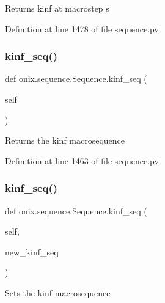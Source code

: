 \begin{DoxyVerb}Returns kinf at macrostep s\end{DoxyVerb}
 

Definition at line 1478 of file sequence.\+py.

\mbox{\label{classonix_1_1sequence_1_1Sequence_a26c2778e995e1732009b0748bc36104f}} 
\subsubsection{\texorpdfstring{kinf\+\_\+seq()}{kinf\_seq()}\hspace{0.1cm}{\footnotesize\ttfamily [1/2]}}
{\footnotesize\ttfamily def onix.\+sequence.\+Sequence.\+kinf\+\_\+seq (\begin{DoxyParamCaption}\item[{}]{self }\end{DoxyParamCaption})}

\begin{DoxyVerb}Returns the kinf macrosequence
\end{DoxyVerb}
 

Definition at line 1463 of file sequence.\+py.

\mbox{\label{classonix_1_1sequence_1_1Sequence_ab727e89adfff510786e97320d45953aa}} 
\subsubsection{\texorpdfstring{kinf\+\_\+seq()}{kinf\_seq()}\hspace{0.1cm}{\footnotesize\ttfamily [2/2]}}
{\footnotesize\ttfamily def onix.\+sequence.\+Sequence.\+kinf\+\_\+seq (\begin{DoxyParamCaption}\item[{}]{self,  }\item[{}]{new\+\_\+kinf\+\_\+seq }\end{DoxyParamCaption})}

\begin{DoxyVerb}Sets the kinf macrosequence
\end{DoxyVerb}
 

